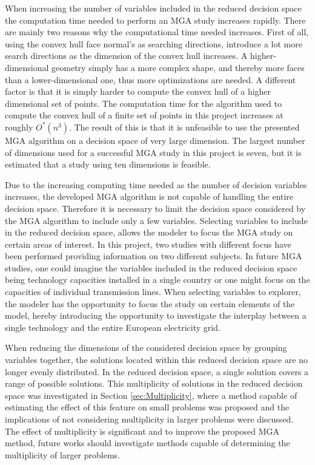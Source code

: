 When increasing the number of variables included in the reduced decision space the computation time needed to perform an MGA study increases rapidly. There are mainly two reasons why the computational time needed increases. First of all, using the convex hull face normal's as searching directions, introduce a lot more search directions as the dimension of the convex hull increases. A higher-dimensional geometry simply has a more complex shape, and thereby more faces than a lower-dimensional one, thus more optimizations are needed. A different factor is that it is simply harder to compute the convex hull of a higher dimensional set of points. The computation time for the algorithm used to compute the convex hull of a finite set of points in this project \cite{qhull} increases at roughly $O^*(n^3)$. The result of this is that it is unfeasible to use the presented MGA algorithm on a decision space of very large dimension. The largest number of dimensions used for a successful MGA study in this project is seven, but it is estimated that a study using ten dimensions is feasible. 

Due to the increasing computing time needed as the number of decision variables increases, the developed MGA algorithm is not capable of handling the entire decision space. Therefore it is necessary to limit the decision space considered by the MGA algorithm to include only a few variables. Selecting variables to include in the reduced decision space, allows the modeler to focus the MGA study on certain areas of interest. In this project, two studies with different focus have been performed providing information on two different subjects. In future MGA studies, one could imagine the variables included in the reduced decision space being technology capacities installed in a single country or one might focus on the capacities of individual transmission lines. When selecting variables to explorer, the modeler has the opportunity to focus the study on certain elements of the model, hereby introducing the opportunity to investigate the interplay between a single technology and the entire European electricity grid.  

When reducing the dimensions of the considered decision space by grouping variables together, the solutions located within this reduced decision space are no longer evenly distributed. In the reduced decision space, a single solution covers a range of possible solutions. This multiplicity of solutions in the reduced decision space was investigated in Section \ref{sec:Multiplicity}, where a method capable of estimating the effect of this feature on small problems was proposed and the implications of not considering multiplicity in larger problems were discussed. The effect of multiplicity is significant and to improve the proposed MGA method, future works should investigate methods capable of determining the multiplicity of larger problems. 

